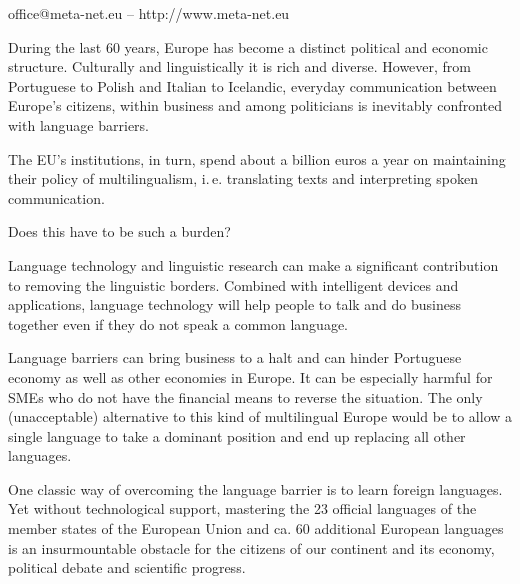 \centerline{office@meta-net.eu -- http://www.meta-net.eu}


\cleardoublepage



\begin{multicols}{2}

During the last 60 years, Europe has become a distinct political and economic structure. Culturally and linguistically it is rich and diverse. However, from Portuguese to Polish and Italian to Icelandic, everyday communication between Europe’s citizens, within business and among politicians is inevitably confronted with language barriers. 

The EU's institutions, in turn, spend about a billion euros a year on maintaining their policy of multilingualism, i.\,e. translating texts and interpreting spoken communication.

Does this have to be such a burden? 

Language technology and linguistic research can make a significant contribution to removing the linguistic borders. Combined with intelligent devices and applications, language technology will help people to talk and do business together even if they do not speak a common language. 


Language barriers can bring business to a halt and can hinder Portuguese economy as well as other economies in Europe. It can be especially harmful for SMEs who do not have the financial means to reverse the situation. The only (unacceptable) alternative to this kind of multilingual Europe would be to allow a single language to take a dominant position and end up replacing all other languages. 

    One classic way of overcoming the language barrier is to learn foreign languages. Yet without technological support, mastering the 23 official languages of the member states of the European Union and ca. 60 additional European languages is an insurmountable obstacle for the citizens of our continent and its economy, political debate and scientific progress.  


\end{multicols}
